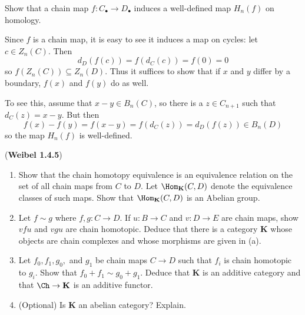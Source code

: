 \documentclass[12pt]{article}
\begin{document}
\begin{prob}
	Show that a chain map $f:C_\bullet\to D_\bullet$ induces a well-defined map $H_n(f)$ on homology.
\end{prob}
\begin{sol}
	Since $f$ is a chain map, it is easy to see it induces a map on cycles: let $c\in Z_n(C)$.
	Then 
	\[d_D(f(c))=f(d_C(c))=f(0)=0\]
	so $f(Z_n(C))\subseteq Z_n(D).$ Thus it suffices to show that if $x$ and $y$ differ by a boundary,
	$f(x)$ and $f(y)$ do as well.

	To see this, assume that $x-y\in B_n(C)$, so there is a $z\in C_{n+1}$ such that $d_C(z)=x-y$.
	But then 
	\[f(x)-f(y)=f(x-y)=f(d_C(z))=d_D(f(z))\in B_n(D)\]
	so the map $H_n(f)$ is well-defined.
\end{sol}

\begin{prob}
	(\textbf{Weibel 1.4.5}) 
	\begin{enumerate}
		\item Show that the chain homotopy equivalence is an equivalence relation on the set of all chain maps from $C$
		to $D$. Let $\Hom_\mathbf{K}(C,D)$ denote the equivalence classes of such maps. Show that $\Hom_\mathbf{K}(C,D)$
		is an Abelian group.
		\item Let $f\sim g$ where $f,g:C\to D$. If $u:B\to C$ and $v:D\to E$ are chain maps, show $vfu$ and $vgu$ are 
		chain homotopic. Deduce that there is a category $\mathbf K$ whose objects are chain complexes and whose morphisms
		are given in (a).
		\item Let $f_0,f_1,g_0,$ and $g_1$ be chain maps $C\to D$ such that $f_i$ is chain homotopic to $g_i$. Show that 
		$f_0+f_1\sim g_0+g_1$. Deduce that $\mathbf K$ is an additive category and that $\Ch\to\mathbf K$ is an 
		additive functor.
		\item (Optional) Is $\mathbf K$ an abelian category? Explain.
	\end{enumerate}
\end{prob}
\end{document}
